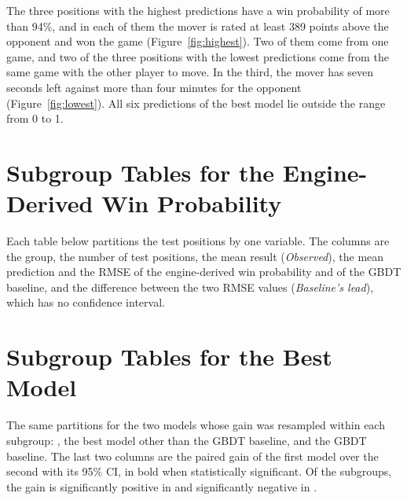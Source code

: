 \documentclass[11pt]{article}
\begin{document}
The three positions with the highest predictions have a win probability of
more than 94\%, and in each of them the mover is rated at least 389 points
above the opponent and won the game (Figure~\ref{fig:highest}). Two of them
come from one game, and two of the three positions with the lowest
predictions come from the same game with the other player to move. In the
third, the mover has seven seconds left against more than four minutes for
the opponent (Figure~\ref{fig:lowest}). All six predictions of the best model
lie outside the range from 0 to 1.



\section{Subgroup Tables for the Engine-Derived Win Probability}

Each table below partitions the test positions by one variable. The columns
are the group, the number of test positions, the mean result
(\emph{Observed}), the mean prediction and the RMSE of the engine-derived win
probability and of the GBDT baseline, and the difference between the two RMSE
values (\emph{Baseline's lead}), which has no confidence interval.


\section{Subgroup Tables for the Best Model}

The same partitions for the two models whose gain was resampled within each
subgroup: , the best model other than the GBDT baseline,
and the GBDT baseline. The last two columns are the paired gain of the first
model over the second with its 95\% CI, in bold when statistically
significant. Of the  subgroups, the gain is significantly
positive in  and significantly negative in
.

\fi
\end{document}
